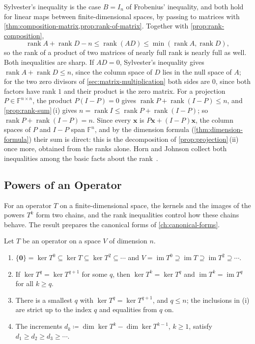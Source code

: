 Sylvester's inequality is the case $B=I_n$ of Frobenius' inequality, and both hold for linear maps between finite-dimensional spaces, by passing to matrices with \cref{thm:composition-matrix,prop:rank-of-matrix}. Together with \cref{prop:rank-composition},
\[
\operatorname{rank}A+\operatorname{rank}D-n\le\operatorname{rank}(AD)\le\min(\operatorname{rank}A,\operatorname{rank}D),
\]
so the rank of a product of two matrices of nearly full rank is nearly full as well. Both inequalities are sharp. If $AD=0$, Sylvester's inequality gives $\operatorname{rank}A+\operatorname{rank}D\le n$, since the column space of $D$ lies in the null space of $A$; for the two zero divisors of \cref{sec:matrix-multiplication} both sides are $0$, since both factors have rank $1$ and their product is the zero matrix. For a projection $P\in\mathbb F^{n\times n}$, the product $P(I-P)=0$ gives $\operatorname{rank}P+\operatorname{rank}(I-P)\le n$, and \cref{prop:rank-sum}\,(i) gives $n=\operatorname{rank}I\le\operatorname{rank}P+\operatorname{rank}(I-P)$; so $\operatorname{rank}P+\operatorname{rank}(I-P)=n$. Since every $\mathbf x$ is $P\mathbf x+(I-P)\mathbf x$, the column spaces of $P$ and $I-P$ span $\mathbb F^n$, and by the dimension formula (\cref{thm:dimension-formula}) their sum is direct: this is the decomposition of \cref{prop:projection}\,(ii) once more, obtained from the ranks alone. Horn and Johnson collect both inequalities among the basic facts about the rank~\cite[Sect.~0.4]{horn2013}.

\subsection{Powers of an Operator}

For an operator $T$ on a finite-dimensional space, the kernels and the images of the powers $T^k$ form two chains, and the rank inequalities control how these chains behave. The result prepares the canonical forms of \cref{ch:canonical-forms}.

\begin{proposition}
\label{prop:kernel-chain}
Let $T$ be an operator on a space $V$ of dimension $n$.
\begin{enumerate}
\item $\{\mathbf 0\}=\ker T^0\subseteq\ker T\subseteq\ker T^2\subseteq\cdots$ and $V=\operatorname{im}T^0\supseteq\operatorname{im}T\supseteq\operatorname{im}T^2\supseteq\cdots$.
\item If $\ker T^q=\ker T^{q+1}$ for some $q$, then $\ker T^k=\ker T^q$ and $\operatorname{im}T^k=\operatorname{im}T^q$ for all $k\ge q$.
\item There is a smallest $q$ with $\ker T^q=\ker T^{q+1}$, and $q\le n$; the inclusions in (i) are strict up to the index $q$ and equalities from $q$ on.
\item The increments $d_k\coloneqq\dim\ker T^k-\dim\ker T^{k-1}$, $k\ge1$, satisfy $d_1\ge d_2\ge d_3\ge\cdots$.
\end{enumerate}
\end{proposition}


